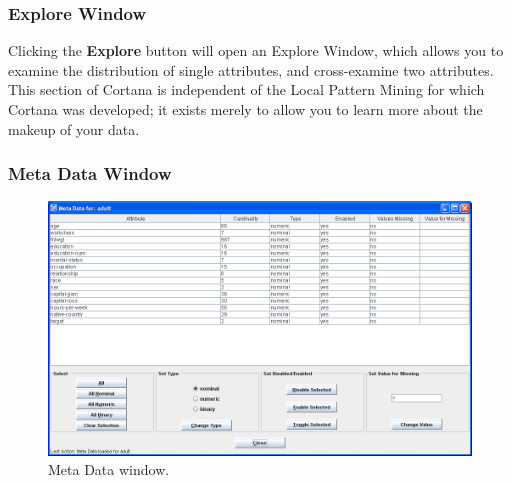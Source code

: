 \documentclass{article}
\begin{document}

\subsubsection{Explore Window}

Clicking the \textbf{Explore} button will open an Explore Window, which
allows you to examine the distribution of single attributes, and
cross-examine two attributes.  This section of Cortana is independent of the
Local Pattern Mining for which Cortana was developed; it exists merely to
allow you to learn more about the makeup of your data.

\subsubsection{Meta Data Window}
\label{sec:metadata}

\begin{figure}
\begin{center}
\includegraphics[width=\columnwidth]{metadatawindow.png}
\caption{Meta Data window.}
\end{center}
\label{fig:metadatawindow}
\end{figure}
\end{document}
